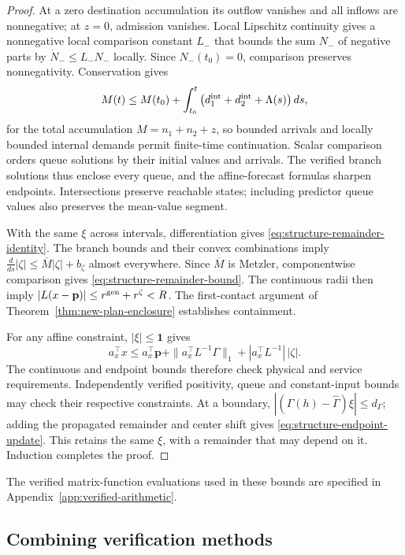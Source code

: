 \documentclass[final]{cas-sc}
\theoremstyle{definition}
\theoremstyle{plain}
\theoremstyle{definition}
\theoremstyle{plain}
\newcommand{\appref}[1]{Appendix~\ref{#1}}
\begin{document}
\begin{proof}
At a zero destination accumulation its outflow vanishes and all inflows
are nonnegative; at $z=0$, admission vanishes. Local Lipschitz
continuity gives a nonnegative local comparison constant $L_-$ that
bounds the sum $N_-$ of negative parts by $\dot N_-\le L_-N_-$ locally.
Since $N_-(t_0)=0$, comparison \cite{khalil2002nonlinear} preserves
nonnegativity. Conservation gives
\[
M(t)\le M(t_0)+\int_{t_0}^{t}
\big(d_1^{\rm int}+d_2^{\rm int}+\Lambda(s)\big)\,ds,
\]
for the total accumulation $M=n_1+n_2+z$, so bounded arrivals and
locally bounded internal demands permit finite-time continuation. Scalar comparison orders queue solutions by
their initial values and arrivals. The verified branch solutions thus
enclose every queue, and the affine-forecast formulas sharpen
endpoints. Intersections preserve reachable states; including predictor
queue values also preserves the mean-value segment.

With the same $\xi$ across intervals, differentiation gives
\eqref{eq:structure-remainder-identity}. The branch bounds and their convex
combinations imply
$\frac{d}{ds}|\zeta|\le\overline M|\zeta|+b_\zeta$ almost everywhere.
Since $\overline M$ is Metzler, componentwise comparison gives
\eqref{eq:structure-remainder-bound}. The continuous radii then imply
$|L(x-\mathbf p)|\le r^{\rm gen}+r^{\zeta}<R$. The first-contact
argument of Theorem~\ref{thm:new-plan-enclosure} establishes containment.

For any affine constraint, $|\xi|\le\mathbf 1$ gives
\[
a_x^\top x\le a_x^\top\mathbf p+\|a_x^\top L^{-1}\Gamma\|_1
+|a_x^\top L^{-1}|\,|\zeta|.
\]
The continuous and endpoint bounds therefore check physical and service
requirements. Independently verified positivity, queue and
constant-input bounds may check their respective constraints. At a
boundary, $|(\Gamma(h)-\widehat\Gamma)\xi|\le d_\Gamma$; adding the
propagated remainder and center shift gives
\eqref{eq:structure-endpoint-update}. This retains the same $\xi$, with a
remainder that may depend on it. Induction completes the proof.
\end{proof}

The verified matrix-function evaluations used in these bounds are
specified in \appref{app:verified-arithmetic}.

\subsection{Combining verification methods}
\label{sec:combining-checks}
\end{document}
